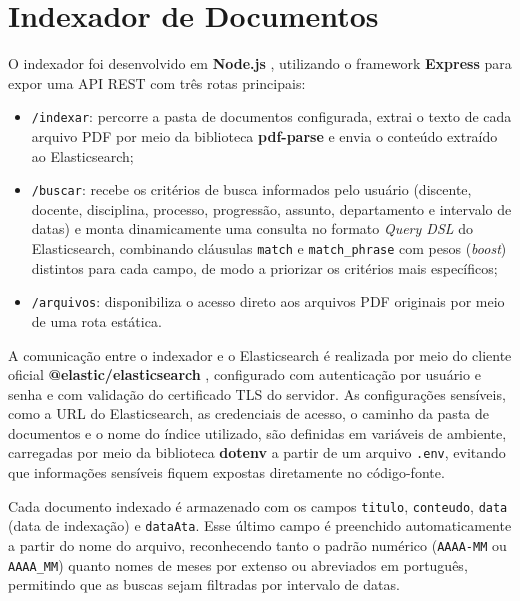 \section{Indexador de Documentos}\label{sec:indexador-documentos}

O indexador foi desenvolvido em \textbf{Node.js} \cite{nodejs-docs}, utilizando o framework \textbf{Express} \cite{expressjs-docs} para expor uma API REST com três rotas principais:

\begin{itemize}
  \item \texttt{/indexar}: percorre a pasta de documentos configurada, extrai o texto de cada arquivo PDF por meio da biblioteca \textbf{pdf-parse} \cite{pdfparse-npm} e envia o conteúdo extraído ao Elasticsearch;
  \item \texttt{/buscar}: recebe os critérios de busca informados pelo usuário (discente, docente, disciplina, processo, progressão, assunto, departamento e intervalo de datas) e monta dinamicamente uma consulta no formato \textit{Query DSL} do Elasticsearch, combinando cláusulas \texttt{match} e \texttt{match\_phrase} com pesos (\textit{boost}) distintos para cada campo, de modo a priorizar os critérios mais específicos;
  \item \texttt{/arquivos}: disponibiliza o acesso direto aos arquivos PDF originais por meio de uma rota estática.
\end{itemize}

A comunicação entre o indexador e o Elasticsearch é realizada por meio do cliente oficial \textbf{@elastic/elasticsearch} \cite{elasticsearch-js}, configurado com autenticação por usuário e senha e com validação do certificado TLS do servidor. As configurações sensíveis, como a URL do Elasticsearch, as credenciais de acesso, o caminho da pasta de documentos e o nome do índice utilizado, são definidas em variáveis de ambiente, carregadas por meio da biblioteca \textbf{dotenv} \cite{dotenv-npm} a partir de um arquivo \texttt{.env}, evitando que informações sensíveis fiquem expostas diretamente no código-fonte.

Cada documento indexado é armazenado com os campos \texttt{titulo}, \texttt{conteudo}, \texttt{data} (data de indexação) e \texttt{dataAta}. Esse último campo é preenchido automaticamente a partir do nome do arquivo, reconhecendo tanto o padrão numérico (\texttt{AAAA-MM} ou \texttt{AAAA\_MM}) quanto nomes de meses por extenso ou abreviados em português, permitindo que as buscas sejam filtradas por intervalo de datas.

